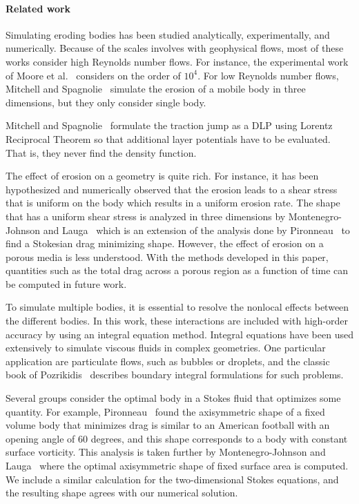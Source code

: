 \documentclass[preprint, 10pt]{elsarticle}
\begin{document}
\paragraph{Related work} Simulating eroding bodies has been studied
analytically, experimentally, and numerically.  Because of the scales
involves with geophysical flows, most of these works consider high
Reynolds number flows.  For instance, the experimental work of Moore et
al.~\cite{moo-ris-chi-zha-she2013} considers on the order of $10^4$.
For low Reynolds number flows, Mitchell and Spagnolie~\cite{mit-spa2016}
simulate the erosion of a mobile body in three dimensions, but they only
consider single body.  

Mitchell and Spagnolie~\cite{mit-spa2016} formulate the traction jump as
a DLP using Lorentz Reciprocal Theorem so that additional layer
potentials have to be evaluated.  That is, they never find the density
function.

The effect of erosion on a geometry is quite rich.  For instance, it has
been hypothesized and numerically observed that the erosion leads to a
shear stress that is uniform on the body which results in a uniform
erosion rate.  The shape that has a uniform shear stress is analyzed in
three dimensions by Montenegro-Johnson and Lauga~\cite{mon-lau2015}
which is an extension of the analysis done by Pironneau~\cite{pir1973}
to find a Stokesian drag minimizing shape.  However, the effect of
erosion on a porous media is less understood.  With the methods
developed in this paper, quantities such as the total drag across a
porous region as a function of time can be computed in future work.



To simulate multiple bodies, it is essential to resolve the nonlocal
effects between the different bodies.  In this work, these interactions
are included with high-order accuracy by using an integral equation
method.  Integral equations have been used extensively to simulate
viscous fluids in complex geometries.  One particular application are
particulate flows, such as bubbles or droplets, and the classic book of
Pozrikidis~\cite{poz1992} describes boundary integral formulations for
such problems.

Several groups consider the optimal body in a Stokes fluid that
optimizes some quantity.  For example, Pironneau~\cite{pir1973} found
the axisymmetric shape of a fixed volume body that minimizes drag is
similar to an American football with an opening angle of 60 degrees, and
this shape corresponds to a body with constant surface vorticity.  This
analysis is taken further by Montenegro-Johnson and
Lauga~\cite{mon-lau2015} where the optimal axisymmetric shape of fixed
surface area is computed.  We include a similar calculation for the
two-dimensional Stokes equations, and the resulting shape agrees with
our numerical solution. 
\end{document}
